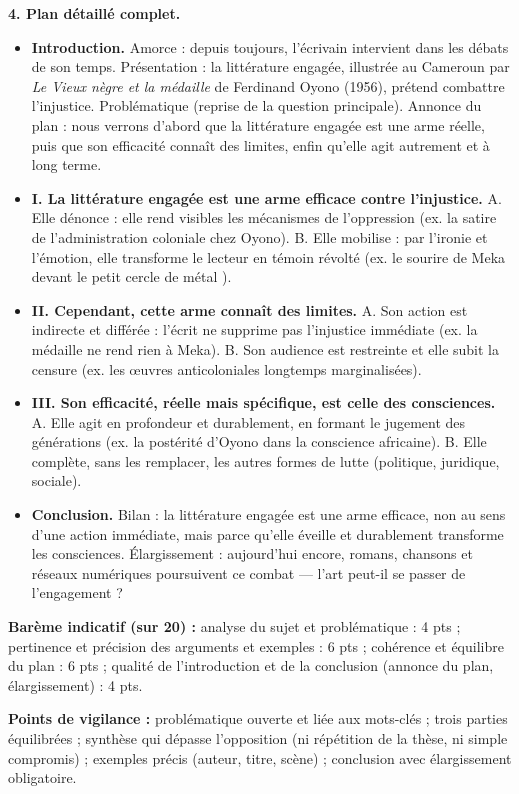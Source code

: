 \documentclass[11pt]{article}
\begin{document}
\begin{corrige}
\textbf{4. Plan détaillé complet.}
\begin{itemize}
\item \textbf{Introduction.} Amorce : depuis toujours, l'écrivain intervient dans les débats de son temps. Présentation : la littérature engagée, illustrée au Cameroun par \emph{Le Vieux nègre et la médaille} de Ferdinand Oyono (1956), prétend combattre l'injustice. Problématique (reprise de la question principale). Annonce du plan : nous verrons d'abord que la littérature engagée est une arme réelle, puis que son efficacité connaît des limites, enfin qu'elle agit autrement et à long terme.
\item \textbf{I. La littérature engagée est une arme efficace contre l'injustice.} A. Elle dénonce : elle rend visibles les mécanismes de l'oppression (ex. la satire de l'administration coloniale chez Oyono). B. Elle mobilise : par l'ironie et l'émotion, elle transforme le lecteur en témoin révolté (ex. le sourire de Meka devant le \og petit cercle de métal \fg{}).
\item \textbf{II. Cependant, cette arme connaît des limites.} A. Son action est indirecte et différée : l'écrit ne supprime pas l'injustice immédiate (ex. la médaille ne rend rien à Meka). B. Son audience est restreinte et elle subit la censure (ex. les œuvres anticoloniales longtemps marginalisées).
\item \textbf{III. Son efficacité, réelle mais spécifique, est celle des consciences.} A. Elle agit en profondeur et durablement, en formant le jugement des générations (ex. la postérité d'Oyono dans la conscience africaine). B. Elle complète, sans les remplacer, les autres formes de lutte (politique, juridique, sociale).
\item \textbf{Conclusion.} Bilan : la littérature engagée est une arme efficace, non au sens d'une action immédiate, mais parce qu'elle éveille et durablement transforme les consciences. Élargissement : aujourd'hui encore, romans, chansons et réseaux numériques poursuivent ce combat — l'art peut-il se passer de l'engagement ?
\end{itemize}

\textbf{Barème indicatif (sur 20) :} analyse du sujet et problématique : 4 pts ; pertinence et précision des arguments et exemples : 6 pts ; cohérence et équilibre du plan : 6 pts ; qualité de l'introduction et de la conclusion (annonce du plan, élargissement) : 4 pts.

\textbf{Points de vigilance :} problématique ouverte et liée aux mots-clés ; trois parties équilibrées ; synthèse qui dépasse l'opposition (ni répétition de la thèse, ni simple compromis) ; exemples précis (auteur, titre, scène) ; conclusion avec élargissement obligatoire.
\end{corrige}
\end{document}
